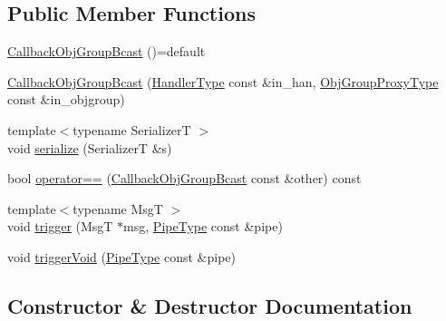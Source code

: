 \subsection*{Public Member Functions}
\begin{DoxyCompactItemize}
\item 
\hyperlink{structvt_1_1pipe_1_1callback_1_1_callback_obj_group_bcast_a8561b655015ff3b5babf80e95f224727}{Callback\+Obj\+Group\+Bcast} ()=default
\item 
\hyperlink{structvt_1_1pipe_1_1callback_1_1_callback_obj_group_bcast_aec9ccc1923795df3108b22e2a96e60b2}{Callback\+Obj\+Group\+Bcast} (\hyperlink{namespacevt_af64846b57dfcaf104da3ef6967917573}{Handler\+Type} const \&in\+\_\+han, \hyperlink{namespacevt_ad7cae989df485fccca57f0792a880a8e}{Obj\+Group\+Proxy\+Type} const \&in\+\_\+objgroup)
\item 
{\footnotesize template$<$typename SerializerT $>$ }\\void \hyperlink{structvt_1_1pipe_1_1callback_1_1_callback_obj_group_bcast_aa54227732bb00239a126c34c78aba5fb}{serialize} (SerializerT \&s)
\item 
bool \hyperlink{structvt_1_1pipe_1_1callback_1_1_callback_obj_group_bcast_a45c2e760843a416992e2a85c265136c7}{operator==} (\hyperlink{structvt_1_1pipe_1_1callback_1_1_callback_obj_group_bcast}{Callback\+Obj\+Group\+Bcast} const \&other) const
\item 
{\footnotesize template$<$typename MsgT $>$ }\\void \hyperlink{structvt_1_1pipe_1_1callback_1_1_callback_obj_group_bcast_aa39774bf2c1e2eeebf19339ad06253c8}{trigger} (MsgT $\ast$msg, \hyperlink{namespacevt_ac9852acda74d1896f48f406cd72c7bd3}{Pipe\+Type} const \&pipe)
\item 
void \hyperlink{structvt_1_1pipe_1_1callback_1_1_callback_obj_group_bcast_ab1a7563aa18693946506a66506f94671}{trigger\+Void} (\hyperlink{namespacevt_ac9852acda74d1896f48f406cd72c7bd3}{Pipe\+Type} const \&pipe)
\end{DoxyCompactItemize}


\subsection{Constructor \& Destructor Documentation}
\mbox{\label{structvt_1_1pipe_1_1callback_1_1_callback_obj_group_bcast_a8561b655015ff3b5babf80e95f224727}} 
